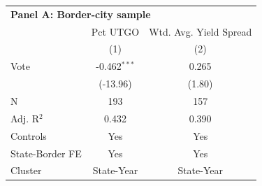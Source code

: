 \begingroup
\centering
\begin{tabular*}{\textwidth}{@{\extracolsep{\fill}}lcc}
\multicolumn{3}{l}{\textbf{Panel A: Border-city sample}}\\

\addlinespace
   \toprule
                   & Pct UTGO       & Wtd. Avg. Yield Spread\\  
                   & (1)            & (2)\\  
   \midrule 
   Vote            & -0.462$^{***}$ & 0.265\\   
                   & (-13.96)      & (1.80)\\   
   \hline
   N    & 193            & 157\\  
   Adj. R$^2$  & 0.432          & 0.390\\  
   Controls                   & Yes            & Yes\\
   State-Border FE & Yes            & Yes\\  
   Cluster              & State-Year & State-Year\\  
   \bottomrule
\end{tabular*}
\par\endgroup
